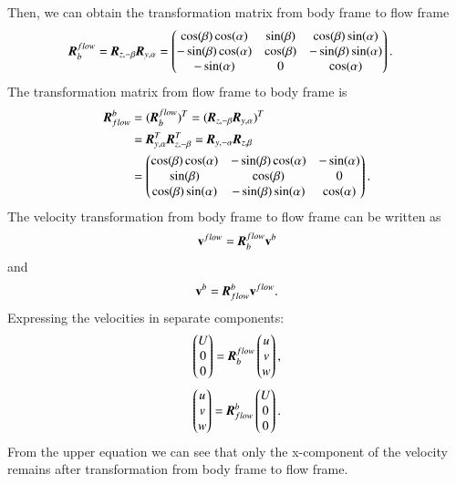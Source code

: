 Then, we can obtain the transformation matrix from body frame to flow frame 
 \begin{align}
 \emph{\textbf{R}}_{b}^{flow}=\emph{\textbf{R}}_{z,-\beta}\emph{\textbf{R}}_{y,\alpha} &= 
 \begin{pmatrix}
\cos(\beta)\cos(\alpha)&\sin(\beta)&\cos(\beta)\sin(\alpha) \\-\sin(\beta)\cos(\alpha)&\cos(\beta)&-\sin(\beta)\sin(\alpha)\\-\sin(\alpha)&0&\cos(\alpha)
 \end{pmatrix}\label{EQ:BodyToFlowTrans}.
 \end{align}
The transformation matrix from flow frame to body frame is
\begin{align}
\emph{\textbf{R}}_{flow}^{b}&=
(\emph{\textbf{R}}_{b}^{flow})^{T}=(\emph{\textbf{R}}_{z,-\beta}\emph{\textbf{R}}_{y,\alpha})^{T} \nonumber 
\\ 
&=\emph{\textbf{R}}_{y,\alpha}^{T}\emph{\textbf{R}}_{z,-\beta}^{T}=\emph{\textbf{R}}_{y,-\alpha}\emph{\textbf{R}}_{z,\beta} \nonumber \\
&=
 \begin{pmatrix}
\cos(\beta)\cos(\alpha)&-\sin(\beta)\cos(\alpha)&-\sin(\alpha) \\ \sin(\beta)&\cos(\beta)&0\\\cos(\beta)\sin(\alpha)&-\sin(\beta)\sin(\alpha)&\cos(\alpha)
 \end{pmatrix}\label{EQ:FlowToBodyTrans}. 
\end{align}
 The velocity transformation from body frame to flow frame can be written as
 \begin{align}
\vec{v}^{flow}= \emph{\textbf{R}}_{b}^{flow}\vec{v}^{b}
\end{align}
and
\begin{align}
\vec{v}^{b}= \emph{\textbf{R}}_{flow}^{b}\vec{v}^{flow}.
\end{align}
Expressing the velocities in separate components:
\begin{align}
\begin{pmatrix}
U\\0\\0
\end{pmatrix}
=
\emph{\textbf{R}}_{b}^{flow}
\begin{pmatrix}
u\\v\\w
\end{pmatrix},\label{EQ:FlowToBodyVelocity}
\end{align}
\begin{align}
\begin{pmatrix}
u\\v\\w
\end{pmatrix}
=
\emph{\textbf{R}}_{flow}^{b}
\begin{pmatrix}
U\\0\\0
\end{pmatrix}.\label{EQ:BodyToFlowVelocity}
\end{align}
From the upper equation we can see that only the x-component of the velocity remains after transformation from body frame to flow frame.

